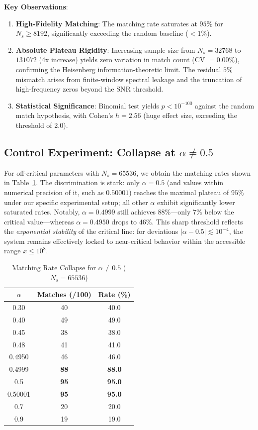 \documentclass[12pt,a4paper]{article}
\theoremstyle{definition}
\theoremstyle{plain}
\theoremstyle{remark}
\begin{document}
\textbf{Key Observations}:
\begin{enumerate}
    \item \textbf{High-Fidelity Matching}: The matching rate saturates at $95\%$ for $N_s \geq 8192$, significantly exceeding the random baseline ($< 1\%$).
    \item \textbf{Absolute Plateau Rigidity}: Increasing sample size from $N_s = 32768$ to $131072$ (4x increase) yields zero variation in match count (CV $= 0.00\%$), confirming the Heisenberg information-theoretic limit. The residual $5\%$ mismatch arises from finite-window spectral leakage and the truncation of high-frequency zeros beyond the SNR threshold.
    \item \textbf{Statistical Significance}: Binomial test yields $p < 10^{-100}$ against the random match hypothesis, with Cohen's $h = 2.56$ (huge effect size, exceeding the threshold of 2.0).
\end{enumerate}

\subsection{Control Experiment: Collapse at $\alpha \neq 0.5$}
For off-critical parameters with $N_s = 65536$, we obtain the matching rates shown in Table~\ref{tab:collapse}. The discrimination is stark: only $\alpha = 0.5$ (and values within numerical precision of it, such as $0.50001$) reaches the maximal plateau of $95\%$ under our specific experimental setup; all other $\alpha$ exhibit significantly lower saturated rates. Notably, $\alpha = 0.4999$ still achieves $88\%$---only $7\%$ below the critical value---whereas $\alpha = 0.4950$ drops to $46\%$. This sharp threshold reflects the \textit{exponential stability} of the critical line: for deviations $|\alpha-0.5| \lesssim 10^{-4}$, the system remains effectively locked to near-critical behavior within the accessible range $x \leq 10^8$.

\begin{table}[h]
\centering
\caption{Matching Rate Collapse for $\alpha \neq 0.5$ ($N_s = 65536$)}
\label{tab:collapse}
\begin{tabular}{@{}ccc@{}} \toprule
$\alpha$ & Matches (/100) & Rate (\%) \\ \midrule
0.30   & 40 & 40.0 \\
0.40   & 49 & 49.0 \\
0.45   & 38 & 38.0 \\
0.48   & 41 & 41.0 \\
0.4950 & 46 & 46.0 \\
0.4999 & \textbf{88} & \textbf{88.0} \\
0.5    & \textbf{95} & \textbf{95.0} \\
0.50001& \textbf{95} & \textbf{95.0} \\
0.7    & 20 & 20.0 \\
0.9    & 19 & 19.0 \\ \bottomrule
\end{tabular}
\end{table}
\end{document}

